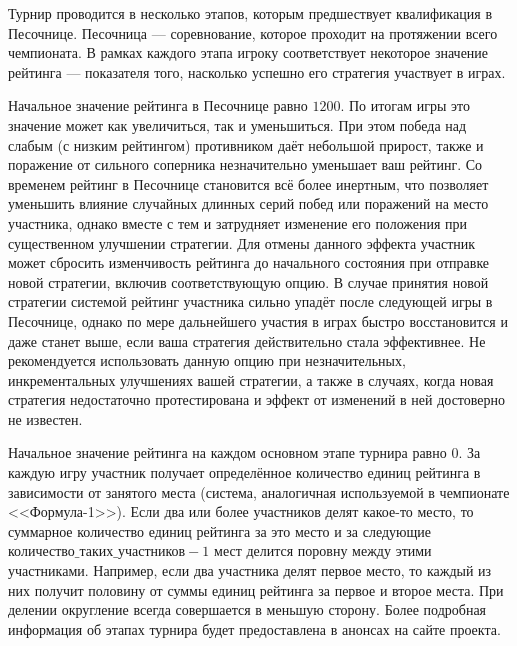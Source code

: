 Турнир проводится в несколько этапов, которым предшествует квалификация в Песочнице. Песочница --- соревнование, которое проходит на
протяжении всего чемпионата. В рамках каждого этапа игроку соответствует некоторое значение рейтинга --- показателя того, насколько успешно
его стратегия участвует в играх.

Начальное значение рейтинга в Песочнице равно $1200$. По итогам игры это значение может как увеличиться, так и уменьшиться. При этом победа
над слабым (с низким рейтингом) противником даёт небольшой прирост, также и поражение от сильного соперника незначительно уменьшает ваш
рейтинг. Со временем рейтинг в Песочнице становится всё более инертным, что позволяет уменьшить влияние случайных длинных серий побед или
поражений на место участника, однако вместе с тем и затрудняет изменение его положения при существенном улучшении стратегии. Для отмены
данного эффекта участник может сбросить изменчивость рейтинга до начального состояния при отправке новой стратегии, включив соответствующую
опцию. В случае принятия новой стратегии системой рейтинг участника сильно упадёт после следующей игры в Песочнице, однако по мере
дальнейшего участия в играх быстро восстановится и даже станет выше, если ваша стратегия действительно стала эффективнее. Не рекомендуется
использовать данную опцию при незначительных, инкрементальных улучшениях вашей стратегии, а также в случаях, когда новая стратегия
недостаточно протестирована и эффект от изменений в ней достоверно не известен.

Начальное значение рейтинга на каждом основном этапе турнира равно $0$. За каждую игру участник получает определённое количество единиц
рейтинга в зависимости от занятого места (система, аналогичная используемой в чемпионате <<Формула-1>>). Если два или более участников делят
какое-то место, то суммарное количество единиц рейтинга за это место и за следующие $\texttt{количество\_таких\_участников}-1$ мест делится
поровну между этими участниками. Например, если два участника делят первое место, то каждый из них получит половину от суммы единиц рейтинга
за первое и второе места. При делении округление всегда совершается в меньшую сторону. Более подробная информация об этапах турнира будет
предоставлена в анонсах на сайте проекта.

